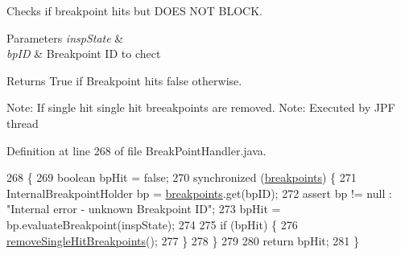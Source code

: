 Checks if breakpoint hits but D\+O\+ES N\+OT B\+L\+O\+CK. 


\begin{DoxyParams}{Parameters}
{\em insp\+State} & \\
\hline
{\em bp\+ID} & Breakpoint ID to chect \\
\hline
\end{DoxyParams}
\begin{DoxyReturn}{Returns}
True if Breakpoint hits false otherwise. \begin{DoxyVerb}    Note: If single hit single hit breeakpoints are removed. Note: Executed by JPF thread\end{DoxyVerb}
 
\end{DoxyReturn}


Definition at line 268 of file Break\+Point\+Handler.\+java.


\begin{DoxyCode}
268                                                                       \{
269     \textcolor{keywordtype}{boolean} bpHit = \textcolor{keyword}{false};
270     \textcolor{keyword}{synchronized} (\hyperlink{classgov_1_1nasa_1_1jpf_1_1inspector_1_1server_1_1breakpoints_1_1_break_point_handler_a034265be2e9419b28fa12d1b860295df}{breakpoints}) \{
271       InternalBreakpointHolder bp = \hyperlink{classgov_1_1nasa_1_1jpf_1_1inspector_1_1server_1_1breakpoints_1_1_break_point_handler_a034265be2e9419b28fa12d1b860295df}{breakpoints}.get(bpID);
272       assert bp != null : \textcolor{stringliteral}{"Internal error - unknown Breakpoint ID"};
273       bpHit = bp.evaluateBreakpoint(inspState);
274 
275       \textcolor{keywordflow}{if} (bpHit) \{
276         \hyperlink{classgov_1_1nasa_1_1jpf_1_1inspector_1_1server_1_1breakpoints_1_1_break_point_handler_ad1ca2ffd97ea8192b9e253f6e6c765a2}{removeSingleHitBreakpoints}();
277       \}
278     \}
279 
280     \textcolor{keywordflow}{return} bpHit;
281   \}
\end{DoxyCode}
